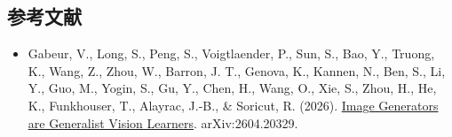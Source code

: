 \hypertarget{ux53c2ux8003ux6587ux732e-149}{%
\subsection{参考文献}\label{ux53c2ux8003ux6587ux732e-149}}

\vspace{0.25em}
\begin{itemize}
\tightlist
\item
  Gabeur, V., Long, S., Peng, S., Voigtlaender, P., Sun, S., Bao, Y., Truong, K., Wang, Z., Zhou, W., Barron, J. T., Genova, K., Kannen, N., Ben, S., Li, Y., Guo, M., Yogin, S., Gu, Y., Chen, H., Wang, O., Xie, S., Zhou, H., He, K., Funkhouser, T., Alayrac, J.-B., \& Soricut, R. (2026). \href{https://arxiv.org/abs/2604.20329}{Image Generators are Generalist Vision Learners}. arXiv:2604.20329.
\end{itemize}

\clearpage
